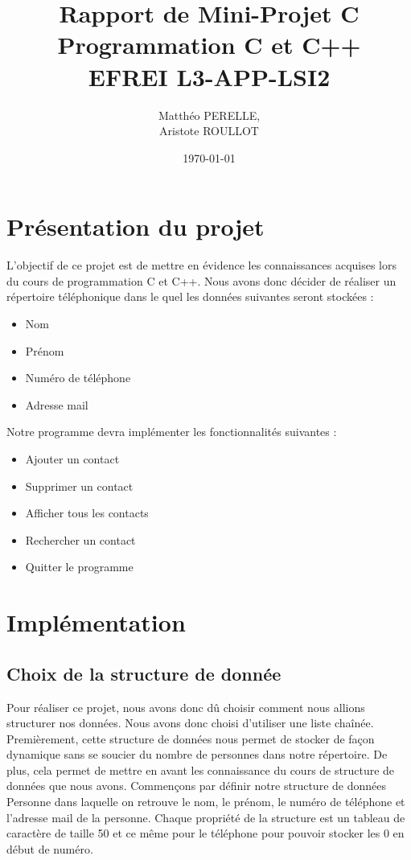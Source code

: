 \documentclass[12pt]{report}
\title{%
  Rapport de Mini-Projet C \\
  \large Programmation C et C++ \\
    EFREI L3-APP-LSI2}
\author{Matthéo PERELLE, \\ Aristote ROULLOT}
\date{\today}
\begin{document}
\maketitle
\tableofcontents

\chapter{Présentation du projet}
L'objectif de ce projet est de mettre en évidence les connaissances acquises lors du cours de programmation C et C++.
Nous avons donc décider de réaliser un répertoire téléphonique dans le quel les données suivantes seront stockées :
\begin{itemize}
    \item Nom
    \item Prénom
    \item Numéro de téléphone
    \item Adresse mail
\end{itemize}

Notre programme devra implémenter les fonctionnalités suivantes :
\begin{itemize}
    \item Ajouter un contact
    \item Supprimer un contact
    \item Afficher tous les contacts
    \item Rechercher un contact
    \item Quitter le programme
\end{itemize}

\chapter{Implémentation}
\section{Choix de la structure de donnée}
Pour réaliser ce projet, nous avons donc dû choisir comment nous allions structurer nos données. Nous avons donc choisi d’utiliser une liste chaînée. Premièrement, cette structure de données nous permet de stocker de façon dynamique sans se soucier du nombre de personnes dans notre répertoire. De plus, cela permet de mettre en avant les connaissance du cours de structure de données que nous avons.
Commençons par définir notre structure de données Personne dans laquelle on retrouve le nom, le prénom, le numéro de téléphone et l’adresse mail de la personne. Chaque propriété de la structure est un tableau de caractère de taille 50 et ce même pour le téléphone pour pouvoir stocker les 0 en début de numéro.
\end{document}
